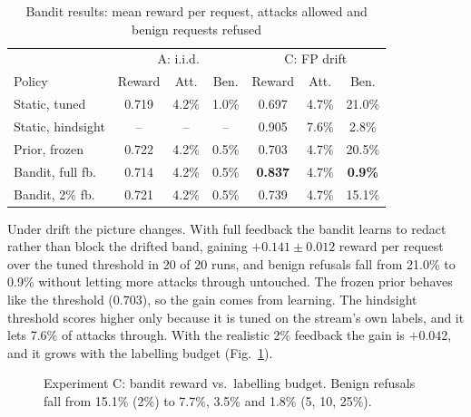 \documentclass[conference]{IEEEtran}
\begin{document}
\begin{table}[t]
\caption{Bandit results: mean reward per request, attacks allowed and
benign requests refused}
\label{tab:bandit}
\centering
\footnotesize
\setlength{\tabcolsep}{3.5pt}
\begin{tabular}{lccc|ccc}
\toprule
 & \multicolumn{3}{c|}{A: i.i.d.} & \multicolumn{3}{c}{C: FP drift} \\
Policy & Reward & Att. & Ben. & Reward & Att. & Ben. \\
\midrule
Static, tuned & 0.719 & 4.2\% & 1.0\% & 0.697 & 4.7\% & 21.0\% \\
Static, hindsight & -- & -- & -- & 0.905 & 7.6\% & 2.8\% \\
Prior, frozen & 0.722 & 4.2\% & 0.5\% & 0.703 & 4.7\% & 20.5\% \\
Bandit, full fb. & 0.714 & 4.2\% & 0.5\% & \textbf{0.837} & 4.7\% & \textbf{0.9\%} \\
Bandit, 2\% fb. & 0.721 & 4.2\% & 0.5\% & 0.739 & 4.7\% & 15.1\% \\
\bottomrule
\end{tabular}
\end{table}

Under drift the picture changes. With full feedback the bandit learns to
redact rather than block the drifted band, gaining $+0.141\pm0.012$ reward
per request over the tuned threshold in 20 of 20 runs, and benign refusals
fall from 21.0\% to 0.9\% without letting more attacks through untouched.
The frozen prior behaves like the threshold (0.703), so the gain comes from
learning. The hindsight threshold scores higher only because it is tuned
on the stream's own labels, and it lets 7.6\% of attacks through. With the
realistic 2\% feedback the gain is $+0.042$, and it grows with the
labelling budget (Fig.~\ref{fig:spot}).

\begin{figure}[t]
\centering
{}
\caption{Experiment C: bandit reward vs.\ labelling budget. Benign
refusals fall from 15.1\% (2\%) to 7.7\%, 3.5\% and 1.8\% (5, 10, 25\%).}
\label{fig:spot}
\end{figure}
\end{document}
